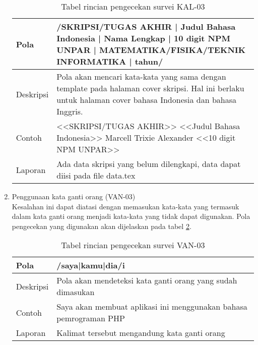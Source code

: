 \begin{enumerate}
	\begin{table}[H]
		\renewcommand{\arraystretch}{1.5}
		\caption {Tabel rincian pengecekan survei KAL-03} 
		\label{tab:kal03}
		\begin{center}
			\begin{tabular}{|p{3.5cm} |p{10.5cm}|}
			\hline 
			Pola & /SKRIPSI/TUGAS AKHIR | Judul Bahasa Indonesia | Nama Lengkap | 10 digit NPM UNPAR | MATEMATIKA/FISIKA/TEKNIK INFORMATIKA | tahun/ \\ 
			\hline 
			Deskripsi & Pola akan mencari kata-kata yang sama dengan template pada halaman cover skripsi. Hal ini berlaku untuk halaman cover bahasa Indonesia dan bahasa Inggris. \\ 
			\hline 
			Contoh & <<SKRIPSI/TUGAS AKHIR>> \newline <<Judul Bahasa Indonesia>> \newline Marcell Trixie Alexander \newline <<10 digit NPM UNPAR>>\\ 
			\hline 
			Laporan & Ada data skripsi yang belum dilengkapi, data dapat diisi pada file data.tex \\ 
			\hline
			\end{tabular}
		\end{center}
	\end{table}
	
	\item Penggunaan kata ganti orang (VAN-03) \\
	Kesalahan ini dapat diatasi dengan memasukan kata-kata yang termasuk dalam kata ganti orang menjadi kata-kata yang tidak dapat digunakan. Pola pengecekan yang digunakan akan dijelaskan pada tabel \ref{tab:van03}.
		
	\begin{table}[H]
		\renewcommand{\arraystretch}{1.5}
		\caption {Tabel rincian pengecekan survei VAN-03} 
		\label{tab:van03}
		\begin{center}
			\begin{tabular}{|p{3.5cm} |p{10.5cm}|}
			\hline 
			Pola & /saya|kamu|dia/i \\ 
			\hline 
			Deskripsi & Pola akan mendeteksi kata ganti orang yang sudah dimasukan \\ 
			\hline 
			Contoh & Saya akan membuat
aplikasi ini menggunakan bahasa pemrograman PHP \\ 
			\hline 
			Laporan & Kalimat tersebut mengandung kata ganti orang \\ 
			\hline
			\end{tabular}
		\end{center}
	\end{table}
	

\end{enumerate}
